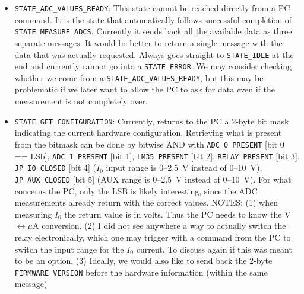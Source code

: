 \documentclass[11pt,a4paper,english]{article}
\begin{document}
\begin{itemize}
\item \texttt{STATE\_ADC\_VALUES\_READY}: This state cannot be reached directly from a PC command. It is the state that automatically follows successful completion of \texttt{STATE\_MEASURE\_ADCS}. Currently it sends back all the available data as three separate messages. It would be better to return a single message with the data that was actually requested. Always goes straight to \texttt{STATE\_IDLE} at the end and currently cannot go into a \texttt{STATE\_ERROR}. We may consider checking whether we come from a \texttt{STATE\_ADC\_VALUES\_READY}, but this may be problematic if we later want to allow the PC to ask for data even if the measurement is not completely over.

\item \texttt{STATE\_GET\_CONFIGURATION}: Currently, returns to the PC a 2-byte bit mask indicating the current hardware configuration. Retrieving what is present from the bitmask can be done by bitwise AND with \texttt{ADC\_0\_PRESENT} [bit 0 == LSb], \texttt{ADC\_1\_PRESENT} [bit 1], \texttt{LM35\_PRESENT} [bit 2], \texttt{RELAY\_PRESENT} [bit 3], \texttt{JP\_I0\_CLOSED} [bit 4] ($I_0$ input range is 0--2.5~V instead of 0--10~V), \texttt{JP\_AUX\_CLOSED} [bit 5] (AUX range is 0--2.5~V instead of 0--10~V). For what concerns the PC, only the LSB is likely interesting, since the ADC measurements already return with the correct values. NOTES: (1) when measuring $I_0$ the return value is in volts. Thus the PC needs to know the V$\leftrightarrow\mu$A conversion. (2) I did not see anywhere a way to actually switch the relay electronically, which one may trigger with a command from the PC to switch the input range for the $I_0$ current. To discuss again if this was meant to be an option. (3) Ideally, we would also like to send back the 2-byte \texttt{FIRMWARE\_VERSION} before the hardware information (within the same message)


\end{itemize}
\end{document}

